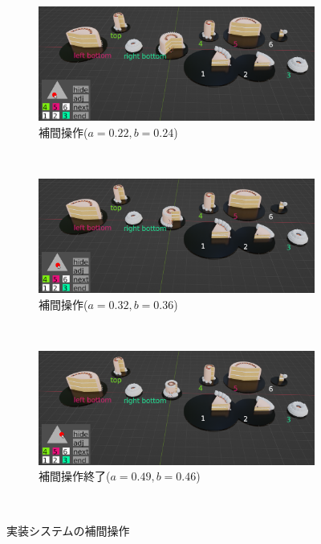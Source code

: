 \begin{figure}
  \centering
  \begin{subfigure}{1\linewidth}
    \centering
    \includegraphics[scale=0.33]{./imgs/systemUse/inter1.png}
    \caption{補間操作($a=0.22,b=0.24$)}\label{fig:sOV_inter1}
  \end{subfigure}\\
  \begin{subfigure}{1\linewidth}
    \centering
    \includegraphics[scale=0.33]{./imgs/systemUse/inter2.png}
    \caption{補間操作($a=0.32,b=0.36$)}\label{fig:sOV_inter2}
  \end{subfigure}\\
  \begin{subfigure}{1\linewidth}
    \centering
    \includegraphics[scale=0.33]{./imgs/systemUse/inter3.png}
    \caption{補間操作終了($a=0.49,b=0.46$)}\label{fig:sOV_inter3}
  \end{subfigure}\\
  \caption{実装システムの補間操作}\label{fig:systemOverViewInter}
\end{figure}

